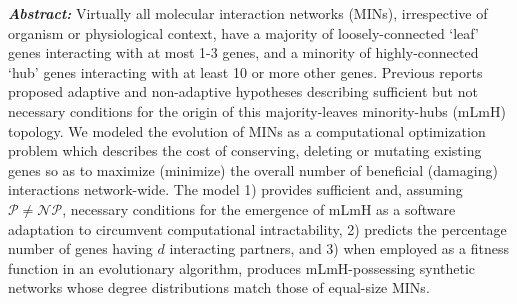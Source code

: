 \noindent\textit{\textbf{Abstract:}} Virtually all molecular interaction networks (MINs), irrespective of organism or physiological context, have a majority of loosely-connected `leaf' genes interacting with at most 1-3 genes, and a minority of highly-connected `hub' genes interacting with at least 10 or more other genes.
    Previous reports proposed adaptive and non-adaptive hypotheses describing sufficient but not necessary conditions for the origin of this majority-leaves minority-hubs (mLmH) topology.
    We modeled the evolution of MINs as a computational optimization problem which describes the cost of conserving, deleting or mutating existing genes so as to maximize (minimize) the overall number of beneficial (damaging) interactions network-wide.
    The model 1) provides sufficient and, assuming $\mathcal{P}\neq \mathcal{NP}$, necessary conditions for the emergence of mLmH as a software adaptation to circumvent computational intractability, 2) predicts the percentage number of genes having $d$ interacting partners, and 3) when employed as a fitness function in an evolutionary algorithm, produces mLmH-possessing synthetic networks whose degree distributions match those of equal-size MINs.

